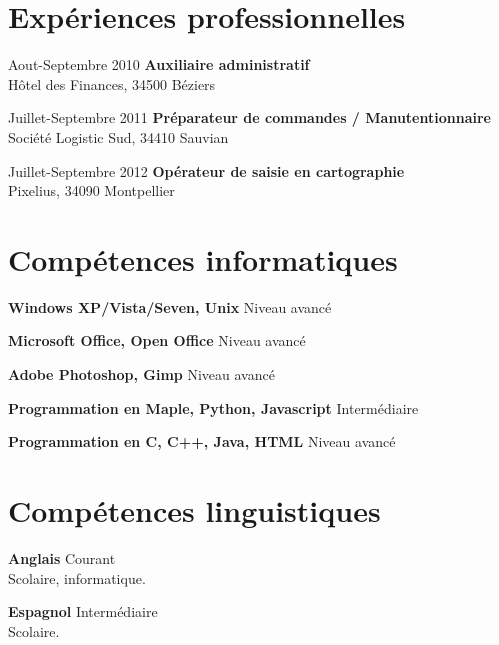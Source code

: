 \documentclass[a4paper]{article}
\begin{document}
\section*{Expériences professionnelles}
Aout-Septembre 2010      \textbf{ Auxiliaire administratif }\\Hôtel des Finances, 34500 Béziers
\bigskip
                         
Juillet-Septembre 2011   \textbf{ Préparateur de commandes / Manutentionnaire }\\Société Logistic Sud, 34410 Sauvian
\bigskip
                         
Juillet-Septembre 2012   \textbf{ Opérateur de saisie en cartographie }\\Pixelius, 34090 Montpellier

\section*{Compétences informatiques}
\textbf{ Windows XP/Vista/Seven, Unix } Niveau avancé
                         
\textbf{ Microsoft Office, Open Office } Niveau avancé
                         
\textbf{ Adobe Photoshop, Gimp } Niveau avancé
                         
\textbf{ Programmation en Maple, Python, Javascript } Intermédiaire
                         
\textbf{ Programmation en C, C++, Java, HTML } Niveau avancé

\section*{Compétences linguistiques}
\textbf{ Anglais } Courant\\Scolaire, informatique.
\bigskip
    
\textbf{ Espagnol } Intermédiaire\\Scolaire.
\end{document}
